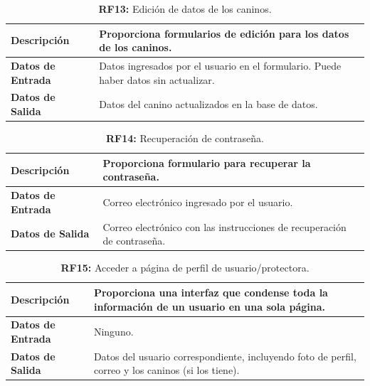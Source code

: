 \documentclass[a4paper, 12pt]{article}
\begin{document}
\begin{table}[H]
\captionsetup{list=no}%
\captionsetup{justification=raggedright,singlelinecheck=false}
\captionsetup{labelformat=empty}
\caption{\textbf{RF13:} Edición de datos de los caninos.}
\label{tab:RF13}
	\begin{tabular}{|m{5cm}|m{10cm}|}
	\hline
	\textbf{Descripción} & Proporciona formularios de edición para los datos de los caninos. \\ 
	\hline
	\textbf{Datos de Entrada} &  Datos ingresados por el usuario en el formulario. Puede haber datos sin actualizar.  \\ 
	\hline
	\textbf{Datos de Salida} &   Datos del canino actualizados en la base de datos. \\ 
	\hline
\end{tabular}
\end{table}

\begin{table}[H]
\captionsetup{list=no}%
\captionsetup{justification=raggedright,singlelinecheck=false}
\captionsetup{labelformat=empty}
\caption{\textbf{RF14:} Recuperación de contraseña.}
\label{tab:RF14}
	\begin{tabular}{|m{5cm}|m{10cm}|}
	\hline
	\textbf{Descripción} & Proporciona formulario para recuperar la contraseña. \\ 
	\hline
	\textbf{Datos de Entrada} & Correo electrónico ingresado por el usuario. \\ 
	\hline
	\textbf{Datos de Salida} & Correo electrónico con las instrucciones de recuperación de contraseña. \\ 
	\hline
\end{tabular}
\end{table}

\begin{table}[H]
\captionsetup{list=no}%
\captionsetup{justification=raggedright,singlelinecheck=false}
\captionsetup{labelformat=empty}
\caption{\textbf{RF15:} Acceder a página de perfil de usuario/protectora.}
\label{tab:RF15}
	\begin{tabular}{|m{5cm}|m{10cm}|}
	\hline
	\textbf{Descripción} & Proporciona una interfaz que condense toda la información de un usuario en una sola página. \\ 
	\hline
	\textbf{Datos de Entrada} & Ninguno. \\ 
	\hline
	\textbf{Datos de Salida} & Datos del usuario correspondiente, incluyendo foto de perfil, correo y los caninos (si los tiene). \\ 
	\hline
\end{tabular}
\end{table}
\end{document}
